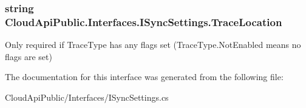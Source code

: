 \hypertarget{interface_cloud_api_public_1_1_interfaces_1_1_i_sync_settings_a892cc8d5732bb7fd17f648adaebe9055}{
\subsubsection[{Trace\-Location}]{\setlength{\rightskip}{0pt plus 5cm}string Cloud\-Api\-Public.\-Interfaces.\-I\-Sync\-Settings.\-Trace\-Location\hspace{0.3cm}{\ttfamily [get]}}}\label{interface_cloud_api_public_1_1_interfaces_1_1_i_sync_settings_a892cc8d5732bb7fd17f648adaebe9055}


Only required if Trace\-Type has any flags set (Trace\-Type.\-Not\-Enabled means no flags are set) 



The documentation for this interface was generated from the following file\-:\begin{DoxyCompactItemize}
\item 
Cloud\-Api\-Public/\-Interfaces/I\-Sync\-Settings.\-cs\end{DoxyCompactItemize}
